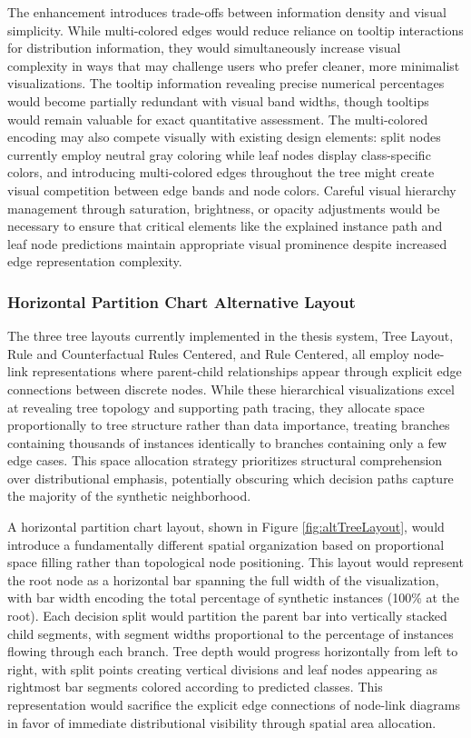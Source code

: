 The enhancement introduces trade-offs between information density and visual simplicity. While multi-colored edges would reduce reliance on tooltip interactions for distribution information, they would simultaneously increase visual complexity in ways that may challenge users who prefer cleaner, more minimalist visualizations. The tooltip information revealing precise numerical percentages would become partially redundant with visual band widths, though tooltips would remain valuable for exact quantitative assessment. The multi-colored encoding may also compete visually with existing design elements: split nodes currently employ neutral gray coloring while leaf nodes display class-specific colors, and introducing multi-colored edges throughout the tree might create visual competition between edge bands and node colors. Careful visual hierarchy management through saturation, brightness, or opacity adjustments would be necessary to ensure that critical elements like the explained instance path and leaf node predictions maintain appropriate visual prominence despite increased edge representation complexity.

\subsubsection{Horizontal Partition Chart Alternative Layout}

The three tree layouts currently implemented in the thesis system, Tree Layout, Rule and Counterfactual Rules Centered, and Rule Centered, all employ node-link representations where parent-child relationships appear through explicit edge connections between discrete nodes. While these hierarchical visualizations excel at revealing tree topology and supporting path tracing, they allocate space proportionally to tree structure rather than data importance, treating branches containing thousands of instances identically to branches containing only a few edge cases. This space allocation strategy prioritizes structural comprehension over distributional emphasis, potentially obscuring which decision paths capture the majority of the synthetic neighborhood.

A horizontal partition chart layout, shown in Figure \ref{fig:altTreeLayout}, would introduce a fundamentally different spatial organization based on proportional space filling rather than topological node positioning. This layout would represent the root node as a horizontal bar spanning the full width of the visualization, with bar width encoding the total percentage of synthetic instances (100\% at the root). Each decision split would partition the parent bar into vertically stacked child segments, with segment widths proportional to the percentage of instances flowing through each branch. Tree depth would progress horizontally from left to right, with split points creating vertical divisions and leaf nodes appearing as rightmost bar segments colored according to predicted classes. This representation would sacrifice the explicit edge connections of node-link diagrams in favor of immediate distributional visibility through spatial area allocation.

